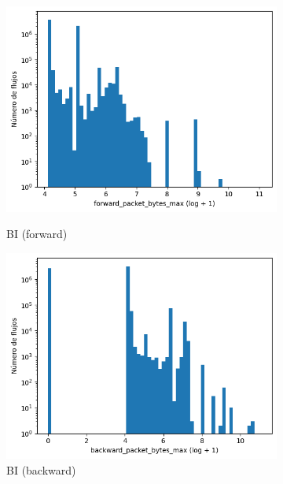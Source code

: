 \begin{figure}[H]
\begin{subfigure}[b]{0.26\textwidth}
        \includegraphics[width=\textwidth]{media/packet_pincer_botiot/forward_packet_bytes_max_log_x_log_y.png}
        \caption{BI (forward)}
        \includegraphics[width=\textwidth]{media/packet_pincer_botiot/backward_packet_bytes_max_log_x_log_y.png}
        \caption{BI (backward)}
    \end{subfigure}
    \hfill
    \begin{subfigure}[b]{0.26\textwidth}
        \centering

\end{subfigure}
\end{figure}
